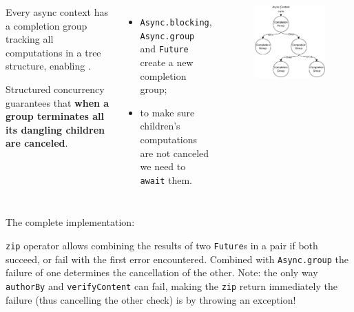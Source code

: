 \documentclass[aspectratio=1610,xcolor=dvipsnames]{beamer}
\begin{document}
\begin{frame}
  \begin{columns}
      \begin{block}{}
        Every async context has a completion group tracking all computations in a tree structure, enabling . 

        Structured concurrency guarantees that \textbf{when a group terminates all its dangling children are canceled}.
      \end{block}
      \begin{itemize}
        \item \texttt{Async.blocking}, \texttt{Async.group} and \texttt{Future} create a new completion group;
        \item to make sure children's computations are not canceled we need to \texttt{await} them.
      \end{itemize}
      \begin{figure}
        \centering
        \includegraphics[width=\textwidth]{./images/structured-concurrency.pdf}
      \end{figure}
  \end{columns}
\end{frame}
%
\begin{frame}
  \small
  The complete implementation:
  
  \texttt{zip} operator allows combining the results of two \texttt{Future}s in a pair if both succeed, or fail with the first error encountered. Combined with \texttt{Async.group} the failure of one determines the cancellation of the other.
  Note: the only way \texttt{authorBy} and \texttt{verifyContent} can fail, making the \texttt{zip} return immediately the failure (thus cancelling the other check) is by throwing an exception!
\end{frame}
\end{document}
